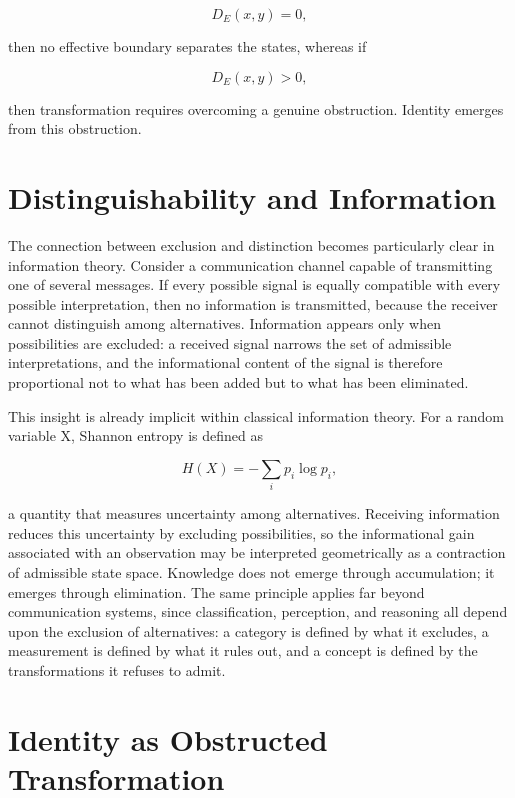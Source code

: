 \documentclass[11pt,oneside]{book}
\theoremstyle{plain}
\theoremstyle{definition}
\theoremstyle{remark}
\begin{document}
\begin{equation}
D_E(x,y)=0,
\end{equation}

then no effective boundary separates the states, whereas if

\begin{equation}
D_E(x,y)>0,
\end{equation}

then transformation requires overcoming a genuine obstruction. Identity emerges from this obstruction.

\section{Distinguishability and Information}

The connection between exclusion and distinction becomes particularly clear in information theory. Consider a communication channel capable of transmitting one of several messages. If every possible signal is equally compatible with every possible interpretation, then no information is transmitted, because the receiver cannot distinguish among alternatives. Information appears only when possibilities are excluded: a received signal narrows the set of admissible interpretations, and the informational content of the signal is therefore proportional not to what has been added but to what has been eliminated.

This insight is already implicit within classical information theory. For a random variable X, Shannon entropy is defined as

\begin{equation}
H(X)
=
-\sum_i p_i
\log p_i,
\end{equation}

a quantity that measures uncertainty among alternatives. Receiving information reduces this uncertainty by excluding possibilities, so the informational gain associated with an observation may be interpreted geometrically as a contraction of admissible state space. Knowledge does not emerge through accumulation; it emerges through elimination. The same principle applies far beyond communication systems, since classification, perception, and reasoning all depend upon the exclusion of alternatives: a category is defined by what it excludes, a measurement is defined by what it rules out, and a concept is defined by the transformations it refuses to admit.

\section{Identity as Obstructed Transformation}
\end{document}
